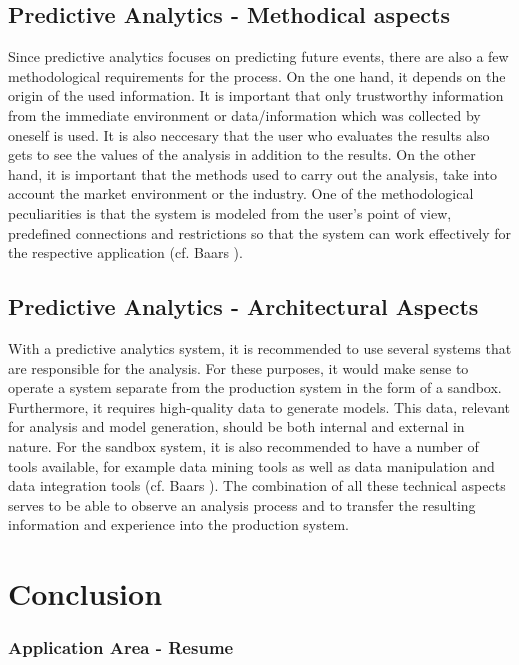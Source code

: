 \documentclass[12pt,twocolumn,twoside]{conference}   %
\begin{document}
\subsection{Predictive Analytics - Methodical aspects}
Since predictive analytics focuses on predicting future events, there are also a few methodological requirements for the process. On the one hand, it depends on the origin of the used information. It is important that only trustworthy information from the immediate environment or data/information which was collected by oneself is used. It is also neccesary that the user who evaluates the results also gets to see the values of the analysis in addition to the results. On the other hand, it is important that the methods used to carry out the analysis, take into account the market environment or the industry. One of the methodological peculiarities is that the system is modeled from the user's point of view, predefined connections and restrictions so that the system can work effectively for the respective application (cf. Baars \cite{1}).

\subsection{Predictive Analytics - Architectural Aspects}
With a predictive analytics system, it is recommended to use several systems that are responsible for the analysis. For these purposes, it would make sense to operate a system separate from the production system in the form of a sandbox. Furthermore, it requires high-quality data to generate models. This data, relevant for analysis and model generation, should be both internal and external in nature. For the sandbox system, it is also recommended to have a number of tools available, for example data mining tools as well as data manipulation and data integration tools (cf. Baars \cite{1}). The combination of all these technical aspects serves to be able to observe an analysis process and to transfer the resulting information and experience into the production system. 

\section{Conclusion}
\subsubsection{Application Area - Resume}
\end{document}
